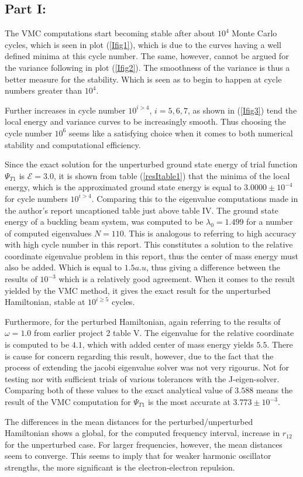 \documentclass[aip,nobalancelastpage,
twocolumn,
rsi,%
 amsmath,amssymb,
 reprint,%
]{revtex4}
\begin{document}
\subsection{Part I:}
The VMC computations start becoming stable after about $10^4$ Monte Carlo cycles, which is seen in plot (\ref{Ifig1}), which is due to the curves having a well defined minima at this cycle number. The same, however, cannot be argued for the variance following in plot (\ref{Ifig2}). The smoothness of the variance is thus a better measure for the stability. Which is seen as to begin to happen at cycle numbers greater than $10^4$.\par
Further increases in cycle number $10^{i>4}$, $i=5,6,7$, as shown in (\ref{Ifig3}) tend the local energy and variance curves to be increasingly smooth. Thus choosing the cycle number $10^6$ seems like a satisfying choice when it comes to both numerical stability and computational efficiency.\par
Since the exact solution for the unperturbed ground state energy of trial function $\Psi_{T1}$ is $\mathcal{E}=3.0$, it is shown from table (\ref{resItable1}) that the minima of the local energy, which is the approximated ground state energy is equal to $3.0000\pm 10^{-4}$ for cycle numbers $10^{i>4}$. Comparing this to the eigenvalue computations made in the author's report \cite[pg.6]{Project2} uncaptioned table just above table IV. The ground state energy of a buckling beam system, was computed to be $\lambda_0 = 1.499$ for a number of computed eigenvalues $N=110$. This is analogous to referring to high accuracy with high cycle number in this report. This constitutes a solution to the relative coordinate eigenvalue problem in this report, thus the center of mass energy must also be added. Which is equal to $1.5 a.u$, thus giving a difference between the results of $10^{-3}$ which is a relatively good agreement. When it comes to the result yielded by the VMC method, it gives the exact result for the unperturbed Hamiltonian, stable at $10^{i\geq 5}$ cycles.\par
Furthermore, for the perturbed Hamiltonian, again referring to the results of $\omega=1.0$ from earlier project 2 \cite[pg.6]{Project2} table V. The eigenvalue for the relative coordinate is computed to be $4.1$, which with added center of mass energy yields $5.5$. There is cause for concern regarding this result, however, due to the fact that the process of extending the jacobi eigenvalue solver was not very rigourus. Not for testing nor with sufficient trials of various tolerances with the J-eigen-solver. Comparing both of these values to the exact analytical value of $3.588$ means the result of the VMC computation for $\Psi_{T1}$ is the most accurate at $3.773\pm 10^{-3}$. \par
The differences in the mean distances for the perturbed/unperturbed Hamiltonian shows a global, for the computed frequency interval, increase in $r_{12}$ for the unperturbed case. For larger frequencies, however, the mean distances seem to converge. This seems to imply that for weaker harmonic oscillator strengths, the more significant is the electron-electron repulsion.
\end{document}
